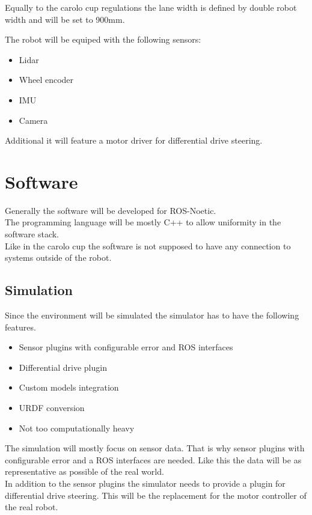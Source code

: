 Equally to the carolo cup regulations the lane width is defined by double robot width and will be set to 900mm. 

The robot will be equiped with the following sensors:

\begin{itemize}
	\item Lidar
	\item Wheel encoder
	\item IMU
	\item Camera
\end{itemize}

Additional it will feature a motor driver for differential drive steering.

\section{Software}
Generally the software will be developed for ROS-Noetic.\\
The programming language will be mostly C++ to allow uniformity in the software stack.\\
Like in the carolo cup the software is not supposed to have any connection to systems outside of the robot.\\

\subsection{Simulation}
Since the environment will be simulated the simulator has to have the following features.
\begin{itemize}
	\item Sensor plugins with configurable error and ROS interfaces
	\item Differential drive plugin
	\item Custom models integration
	\item URDF conversion
	\item Not too computationally heavy
\end{itemize}

The simulation will mostly focus on sensor data. That is why sensor plugins with configurable error and a ROS interfaces are needed. Like this the data will be as representative as possible of the real world.\\

In addition to the sensor plugins the simulator needs to provide a plugin for differential drive steering. This will be the replacement for the motor controller of the real robot.\\

